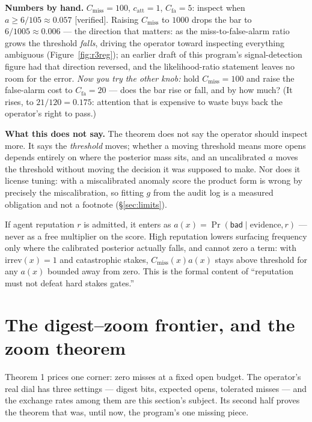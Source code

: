 \documentclass[11pt,a4paper]{article}
\begin{document}
\textbf{Numbers by hand.} $C_{\mathrm{miss}}{=}100$, $c_{\mathrm{att}}{=}1$, $C_{\mathrm{fa}}{=}5$: inspect when $a\ge 6/105\approx 0.057$ [verified]. Raising $C_{\mathrm{miss}}$ to $1000$ drops the bar to $6/1005\approx 0.006$ --- the direction that matters: as the miss-to-false-alarm ratio grows the threshold \emph{falls}, driving the operator toward inspecting everything ambiguous (Figure~\ref{fig:r3reg}); an earlier draft of this program's signal-detection figure had that direction reversed, and the likelihood-ratio statement leaves no room for the error. \emph{Now you try the other knob:} hold $C_{\mathrm{miss}}{=}100$ and raise the false-alarm cost to $C_{\mathrm{fa}}{=}20$ --- does the bar rise or fall, and by how much? (It rises, to $21/120=0.175$: attention that is expensive to waste buys back the operator's right to pass.)

\textbf{What this does not say.} The theorem does not say the operator should inspect more. It says the \emph{threshold} moves; whether a moving threshold means more opens depends entirely on where the posterior mass sits, and an uncalibrated $a$ moves the threshold without moving the decision it was supposed to make. Nor does it license tuning: with a miscalibrated anomaly score the product form is wrong by precisely the miscalibration, so fitting $g$ from the audit log is a measured obligation and not a footnote (\S\ref{sec:limits}).

\begin{claim}
If agent reputation $r$ is admitted, it enters as $a(x)=\Pr(\mathsf{bad}\mid\text{evidence},r)$ --- never as a free multiplier on the score. High reputation lowers surfacing frequency only where the calibrated posterior actually falls, and cannot zero a term: with $\mathrm{irrev}(x)=1$ and catastrophic stakes, $C_{\mathrm{miss}}(x)a(x)$ stays above threshold for any $a(x)$ bounded away from zero. This is the formal content of ``reputation must not defeat hard stakes gates.''
\end{claim}



\section{The digest--zoom frontier, and the zoom theorem}\label{sec:frontier}
Theorem 1 prices one corner: zero misses at a fixed open budget. The operator's real dial has three settings --- digest bits, expected opens, tolerated misses --- and the exchange rates among them are this section's subject. Its second half proves the theorem that was, until now, the program's one missing piece.
\end{document}
